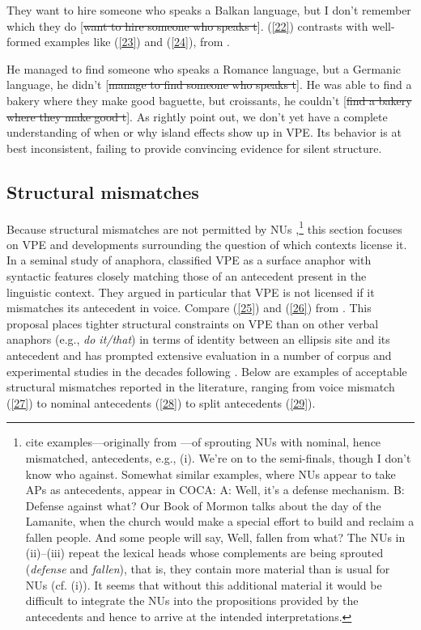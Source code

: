 \documentclass[output=paper
                ,modfonts
                ,nonflat
	        ,collection
	        ,collectionchapter
	        ,collectiontoclongg
 	        ,biblatex
                ,babelshorthands
                ,newtxmath
                ,draftmode
                ,colorlinks, citecolor=brown
]{./langsci/langscibook}
\begin{document}
{\ea *They want to hire someone who speaks a Balkan language, but I don't remember which they do [\sout{want to hire someone who speaks t}]. \citep[6]{Merchant2001}\label{22}\z
(\ref{22}) contrasts with well-formed examples like (\ref{23}) and (\ref{24}), from \citet{Ginzburg2018}.

\ea He managed to find someone who speaks a Romance language, but a Germanic language, he didn't [\sout{manage to find someone who speaks t}].\label{23}\z
\ea He was able to find a bakery where they make good baguette, but croissants, he couldn't [\sout{find a bakery where they make good t}].\label{24}\z
As \citet{Ginzburg2018} rightly point out, we don't yet have a complete understanding of when or why island effects show up in VPE. Its behavior is at best inconsistent, failing to provide convincing evidence for silent structure.


\subsection{Structural mismatches}
Because structural mismatches are not permitted by NUs \citep[see][]{Merchant2005, Merchant2013},\footnote{\citet{Ginzburg2018} cite examples---originally from \citet{Beecher2008}---of sprouting NUs with nominal, hence mismatched, antecedents, e.g., (i).
	\ea We're on to the semi-finals, though I don't know who against.\z
	Somewhat similar examples, where NUs appear to take APs as antecedents, appear in COCA:
	\ea  A: Well, it's a defense mechanism. B: Defense against what?\z
	\ea Our Book of Mormon talks about the day of the Lamanite, when the church would make a special effort to build and reclaim a fallen people. And some people will say, Well, fallen from what? \z
	The NUs in (ii)--(iii) repeat the lexical heads whose complements are being sprouted ({\it defense} and {\it fallen}), that is, they contain more material than is usual for NUs (cf. (i)). It seems that without this additional material it would be difficult to integrate the NUs into the propositions provided by the antecedents and hence to arrive at the intended interpretations.
} this section focuses on VPE and developments surrounding the question of which contexts license it. In a seminal study of anaphora, \citet{Hankamer1976} classified VPE as a surface anaphor with syntactic features closely matching those of an antecedent present in the linguistic context. They argued in particular that VPE is not licensed if it mismatches its antecedent in voice. Compare (\ref{25}) and (\ref{26}) from \citet[327]{Hankamer1976}.
\z
{}
\z
This proposal places tighter structural constraints on VPE than on other verbal anaphors (e.g., \emph{do it/that}) in terms of identity between an ellipsis site and its antecedent and has prompted extensive evaluation in a number of corpus and experimental studies in the decades following \citet{Hankamer1976}. Below are examples of acceptable structural mismatches reported in the literature, ranging from voice mismatch (\ref{27}) to nominal antecedents (\ref{28}) to split antecedents (\ref{29}).

}
\end{document}

